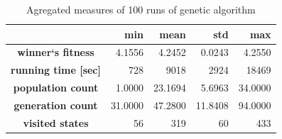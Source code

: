 \documentclass[a4paper,jurnal]{IEEEtran}
\begin{document}
\begin{table}[h]
	\caption{Agregated measures of 100 runs of genetic algorithm}
	\centering
	\begin{tabular}{|c||r|r|r|r|}
		\hline
			\textbf{} &  \textbf{min} & \textbf{mean} & \textbf{std} &  \textbf{max} \\
		\hline
		\hline
			\textbf{winner`s  fitness} & 4.1556 & 4.2452 & 0.0243 & 4.2550 \\ \hline
			\textbf{running time [sec]} & 728 & 9018 & 2924 & 18469 \\ \hline
			\textbf{population count} & 1.0000 & 23.1694 & 5.6963 & 34.0000 \\ \hline
			\textbf{generation count} & 31.0000 & 47.2800 & 11.8408 & 94.0000 \\ \hline
			\textbf{visited states} & 56 & 319 & 60 & 433 \\ \hline
	\end{tabular}
	\label{tbl:garesults}
\end{table}
\end{document}
